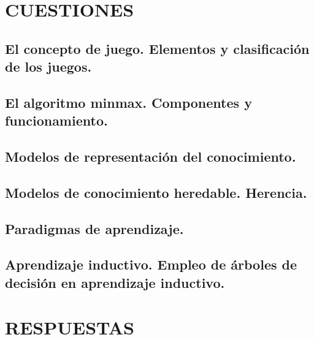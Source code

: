 \documentclass[a4paper, 11pt]{article}
\begin{document}
	




\renewcommand{\abstractname}{Resumen} %


\color{darkGray}
{\parskip=2pt
  \tableofcontents
}
\section{CUESTIONES}
\subsection{El concepto de juego. Elementos y clasificación de los juegos.}
\subsection{El algoritmo minmax. Componentes y funcionamiento.}
\subsection{Modelos de representación del conocimiento.}
\subsection{Modelos de conocimiento heredable. Herencia.}
\subsection{Paradigmas de aprendizaje.}
\subsection{Aprendizaje inductivo. Empleo de árboles de decisión en aprendizaje inductivo.}
\pagebreak
\section{RESPUESTAS}
\end{document}
